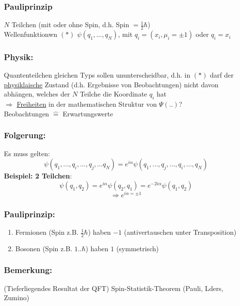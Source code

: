\documentclass[twoside,a4paper]{scrartcl}
\renewcommand{\1}{\mathds{1}}
\newcommand{\Ra}{\Rightarrow}
\begin{document}
\subsubsection*{Pauliprinzip}
$N$ Teilchen (mit oder ohne Spin, d.h. Spin $=\frac{1}{2}\hbar$)\\
Wellenfunktionwn $(*)$ $\psi(q_1,...,q_N)$, mit $q_i=(x_i,\mu_i=\pm 1)$ oder $q_i=x_i$
\subsubsection*{Physik:}
Quantenteilchen gleichen Typs sollen ununterscheidbar, d.h. in $(*)$ darf der \underline{physiklaische} Zustand (d.h. Ergebnisse von Beobachtungen) nicht davon abhängen, welches der $N$ Teilche die Koordinate $q_i$ hat \\
$\Ra$ \underline{Freiheiten} in der mathematischen Struktur von $\Psi(..)$?\\
Beobachtungen $\mathrel{\widehat{=}}$ Erwartungswerte\\
\subsubsection*{Folgerung:}
Es muss gelten: $$\psi(q_1,...,q_i,...,q_j,...q_N)=e^{i\alpha} \psi(q_1,...,q_j,...,q_i,...,q_N)$$
\textbf{Beispiel: 2 Teilchen}:
$$\psi(q_1,q_2)=e^{i\alpha}\psi(q_2,q_1)=e^{-2i\alpha} \psi(q_1,q_2)$$
$$\Ra e^{i\alpha=\pm 1}$$
\subsubsection*{Pauliprinzip:}
\begin{enumerate}
\item Fermionen (Spin z.B. $\frac{1}{2}\hbar$) haben $-1$ (antivertauschen unter Transposition)
\item Bosonen (Spin z.B. $1..\hbar$) haben $1$ (symmetrisch)
\end{enumerate}
\subsubsection*{Bemerkung:}
(Tieferliegendes Resultat der QFT) Spin-Statistik-Theorem (Pauli, Lders, Zumino)
\end{document}

